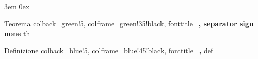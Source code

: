 \usepackage[T1]{fontenc}
\usepackage[utf8]{inputenc}
\usepackage[italian]{babel}
\usepackage{latexsym}
\usepackage{textcomp}
\usepackage{siunitx}

\newcommand{\latex}{\LaTeX\xspace}
\newcommand{\tex}{\TeX\xspace}

\emergencystretch 3em %
\parindent 0ex %
\setlength{\parskip}{\baselineskip} %

\usepackage{fancyhdr}
\pagestyle{fancy}
\fancyhead{} %
\fancyfoot{} %

\fancyhead[RE]{\nouppercase{\leftmark}} %
\fancyhead[LO]{\nouppercase{\rightmark}}
\fancyhead[LE,RO]{\thepage}


\usepackage{titling}
\renewcommand\maketitlehooka{\null\mbox{}\vfill}
\renewcommand\maketitlehookd{\vfill\null}


\usepackage{mdframed}

\usepackage{tcolorbox}
\usepackage{blindtext}
\usepackage{tikz,tkz-tab,amsmath}


	{Teorema}
	{
		colback=green!5,
		colframe=green!35!black,
		fonttitle=\bfseries,
		separator sign none %
	}
	{th}

	{Definizione}%
	{
		colback=blue!5,
		colframe=blue!45!black,
		fonttitle=\bfseries,
	} %
	{def} %